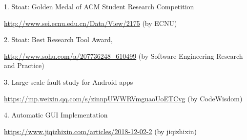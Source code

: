 \documentclass[a4paper]{article}
\begin{document}
{ 1. Stoat: Golden Medal of ACM Student Research Competition
 
 \url{http://www.sei.ecnu.edu.cn/Data/View/2175} (by ECNU)
 
 2. Stoat: Best Research Tool Award, 
 
 \url{http://www.sohu.com/a/207736248_610499} (by Software Engineering Research and Practice)
 
 3. Large-scale fault study for Android apps
 
 \url{https://mp.weixin.qq.com/s/zinnpUWWRVmguaoUoETCvg} (by CodeWisdom)
 
 4. Automatic GUI Implementation
 
 \url{https://www.jiqizhixin.com/articles/2018-12-02-2} (by jiqizhixin)

%
}
\end{document}
